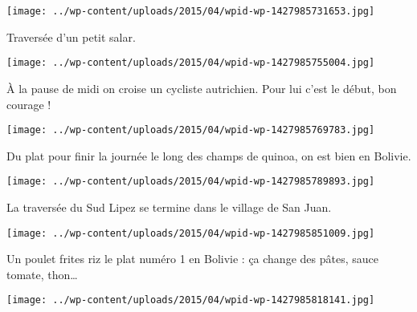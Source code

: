  

\begin{center} \texttt{[image: ../wp-content/uploads/2015/04/wpid-wp-1427985731653.jpg]} \end{center}



 Traversée d'un petit salar.

 

\begin{center} \texttt{[image: ../wp-content/uploads/2015/04/wpid-wp-1427985755004.jpg]} \end{center}



 À la pause de midi on croise un cycliste autrichien. Pour lui c'est le début, bon courage !

 

\begin{center} \texttt{[image: ../wp-content/uploads/2015/04/wpid-wp-1427985769783.jpg]} \end{center}



 Du plat pour finir la journée le long des champs de quinoa, on est bien en Bolivie.

 

\begin{center} \texttt{[image: ../wp-content/uploads/2015/04/wpid-wp-1427985789893.jpg]} \end{center}



 La traversée du Sud Lipez se termine dans le village de San Juan.

 

\begin{center} \texttt{[image: ../wp-content/uploads/2015/04/wpid-wp-1427985851009.jpg]} \end{center}



 Un poulet frites riz le plat numéro 1 en Bolivie : ça change des pâtes, sauce tomate, thon…

 

\begin{center} \texttt{[image: ../wp-content/uploads/2015/04/wpid-wp-1427985818141.jpg]} \end{center}




 
 
